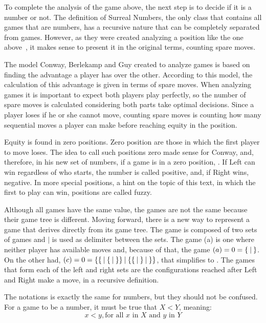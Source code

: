 To complete the analysis of the game above, the next step is to decide if it is a number or not. The definition of Surreal Numbers, the only class that contains all games that are numbers, has a recursive nature that can be completely separated from games. However, as they were created analyzing a position like the one above~\cite{CGT}, it makes sense to present it in the original terms, counting spare moves.

The model Conway, Berlekamp and Guy created to analyze games is based on finding the advantage a player has over the other. According to this model, the calculation of this advantage is given in terms of spare moves. When analyzing games it is important to expect both players play perfectly, so the number of spare moves is calculated considering both parts take optimal decisions. Since a player loses if he or she cannot move, counting spare moves is counting how many sequential moves a player can make before reaching equity in the position.

Equity is found in zero positions. Zero position are those in which the first player to move loses. The idea to call such positions zero made sense for Conway, and, therefore, in his new set of numbers, if a game \Gm{} is in a zero position, . If Left can win regardless of who starts, the number is called positive, and, if Right wins, negative. In more special positions, a hint on the topic of this text, in which the first to play can win, positions are called fuzzy.



Although all games have the same value, the games are not the same because their game tree is different. Moving forward, there is a new way to represent a game that derives directly from its game tree. The game is composed of two sets of games and $\mid$ is used as delimiter between the sets. The game (a) is one where neither player has available moves and, because of that, the game $(a) = 0 = \mbox{$\{\:|\:\}$}$. On the other had, $(c) = 0 = \mbox{$\{\mbox{$\{\:|\:\mbox{$\{\:|\:\}$}\}$}\:|\:\mbox{$\{\mbox{$\{\:|\:\}$}\:|\:\}$}\}$}$, that simplifies to . The games that form each of the left and right sets are the configurations reached after Left and Right make a move, in a recursive definition.

The notations is exactly the same for numbers, but they should not be confused. For a game   to be a number, it must be true that $X < Y$, meaning:
\hspace{-0.5cm}
$$x < y, \mbox{for all $x$ in $X$ and $y$ in $Y$}$$

